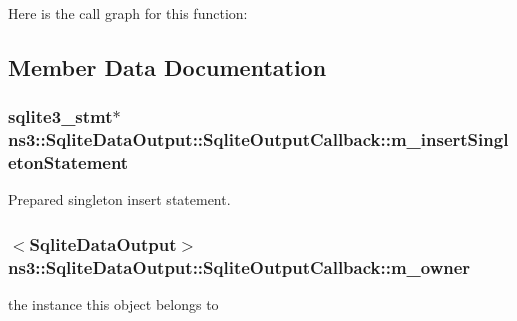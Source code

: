 Here is the call graph for this function\+:




\subsection{Member Data Documentation}
\subsubsection[{\texorpdfstring{m\+\_\+insert\+Singleton\+Statement}{m_insertSingletonStatement}}]{\setlength{\rightskip}{0pt plus 5cm}sqlite3\+\_\+stmt$\ast$ ns3\+::\+Sqlite\+Data\+Output\+::\+Sqlite\+Output\+Callback\+::m\+\_\+insert\+Singleton\+Statement\hspace{0.3cm}{\ttfamily [private]}}\hypertarget{classns3_1_1SqliteDataOutput_1_1SqliteOutputCallback_a4494ed1863eba3aa3a808456a8920e0f}{}\label{classns3_1_1SqliteDataOutput_1_1SqliteOutputCallback_a4494ed1863eba3aa3a808456a8920e0f}


Prepared singleton insert statement. 

\subsubsection[{\texorpdfstring{m\+\_\+owner}{m_owner}}]{$<${\bf Sqlite\+Data\+Output}$>$ ns3\+::\+Sqlite\+Data\+Output\+::\+Sqlite\+Output\+Callback\+::m\+\_\+owner\hspace{0.3cm}{\ttfamily [private]}}\hypertarget{classns3_1_1SqliteDataOutput_1_1SqliteOutputCallback_a89843fd0048254a4b33276f7f6522c1a}{}\label{classns3_1_1SqliteDataOutput_1_1SqliteOutputCallback_a89843fd0048254a4b33276f7f6522c1a}


the instance this object belongs to 

